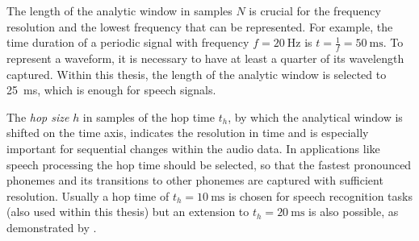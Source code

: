 The length of the analytic window in samples $N$ is crucial for the frequency resolution and the lowest frequency that can be represented.
For example, the time duration of a periodic signal with frequency $f=\SI{20}{\hertz}$ is $t=\frac{1}{f} = \SI{50}{\milli\second}$.
To represent a waveform, it is necessary to have at least a quarter of its wavelength captured.
Within this thesis, the length of the analytic window is selected to \SI{25}{\milli\second}, which is enough for speech signals.

The \emph{hop size} $h$ in samples of the hop time $t_h$, by which the analytical window is shifted on the time axis, indicates the resolution in time and is especially important for sequential changes within the audio data.
In applications like speech processing the hop time should be selected, so that the fastest pronounced phonemes and its transitions to other phonemes are captured with sufficient resolution.
Usually a hop time of $t_{h}=\SI{10}{\milli\second}$ is chosen for speech recognition tasks (also used within this thesis) but an extension to $t_{h}=\SI{20}{\milli\second}$ is also possible, as demonstrated by \cite{Peter2020}.

